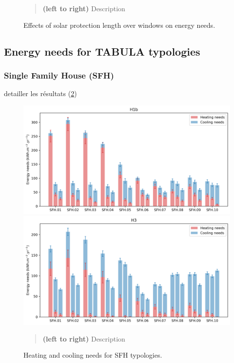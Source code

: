 \documentclass[11pt]{article}
\begin{document}
\begin{figure}[ht]
            \caption{\label{fig:shading_init} Effects of solar protection length over windows on energy needs.}
            \begin{quote}
                \vspace{-2mm}
                \small\noindent
                \textbf{(left to right)} Description
            \end{quote}
        \end{figure}
        

    \subsection{Energy needs for TABULA typologies} %
    \label{sub:energy_needs_for_tabula_typologies}

        \subsubsection{Single Family House (SFH)} %
        \label{ssub:sfh}

        detailler les résultats (\ref{fig:sfh_needs})
        
        \begin{figure}[ht]
            \centering
            \includegraphics[width=0.49\columnwidth]{figures/typology_energy_needs_SFH_H1b_2000-2020.png}
            \includegraphics[width=0.49\columnwidth]{figures/typology_energy_needs_SFH_H3_2000-2020.png}
            \caption{\label{fig:sfh_needs} Heating and cooling needs for SFH typologies.}
            \begin{quote}
                \vspace{-2mm}
                \small\noindent
                \textbf{(left to right)} Description
            \end{quote}
        \end{figure}
\end{document}
